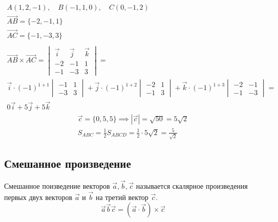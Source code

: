 \begin{eg}
  \begin{gather*}
    A(1, 2, -1), \quad B(-1, 1, 0), \quad C(0, -1, 2) \\
    \overrightarrow{AB} = \{-2, -1, 1\} \\
    \overrightarrow{AC} = \{-1, -3, 3\} \\
    \\
    \overrightarrow{AB} \times \overrightarrow{AC} = 
    \begin{vmatrix}
      \vec{i} & \vec{j} & \vec{k} \\
      -2 & -1 & 1 \\
      -1 & -3 & 3
    \end{vmatrix} = \\
    \vec{i} \cdot (-1)^{1+1}
    \begin{vmatrix}
      -1 & 1 \\
      -3 & 3
    \end{vmatrix} +
    \vec{j} \cdot (-1)^{1+2} 
    \begin{vmatrix}
      -2 & 1 \\
      -1 & 3
    \end{vmatrix} +
    \vec{k} \cdot (-1)^{1+3}
    \begin{vmatrix}
      -2 & -1 \\
      -1 & -3
    \end{vmatrix} =\\
    0 \vec{i} + 5 \vec{j} + 5 \vec{k}
  \end{gather*}
  \begin{gather*}
    \vec{c} = \{0, 5, 5\} \implies |\vec{c}| = \sqrt{50} = 5\sqrt{2} \\
    S_{ABC} = \frac{1}{2} S_{ABCD} = \frac{1}{2} \cdot 5\sqrt{2} = \frac{5}{\sqrt{2}} 
  \end{gather*} 
\end{eg}

\subsection{Смешанное произведение}

\begin{definition}
  Смешанное поизведение векторов $\vec{a}, \vec{b}, \vec{c}$ называется скалярное произведения первых двух векторов $\vec{a}$ и $\vec{b}$ на третий вектор $\vec{c}$.
  \[
  \vec{a} \vec{b} \vec{c} = (\vec{a} \cdot \vec{b}) \times \vec{c}
  \] 
\end{definition}

